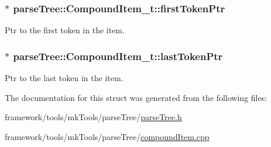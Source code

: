 \subsubsection[{\texorpdfstring{first\+Token\+Ptr}{firstTokenPtr}}]{$\ast$ parse\+Tree\+::\+Compound\+Item\+\_\+t\+::first\+Token\+Ptr}\hypertarget{structparse_tree_1_1_compound_item__t_a587020c943e760cb0152dd8cd31e21ef}{}\label{structparse_tree_1_1_compound_item__t_a587020c943e760cb0152dd8cd31e21ef}


Ptr to the first token in the item. 

\subsubsection[{\texorpdfstring{last\+Token\+Ptr}{lastTokenPtr}}]{$\ast$ parse\+Tree\+::\+Compound\+Item\+\_\+t\+::last\+Token\+Ptr}\hypertarget{structparse_tree_1_1_compound_item__t_aa6fedf65975afb0cbe1d6e952e71c6e3}{}\label{structparse_tree_1_1_compound_item__t_aa6fedf65975afb0cbe1d6e952e71c6e3}


Ptr to the last token in the item. 



The documentation for this struct was generated from the following files\+:\begin{DoxyCompactItemize}
\item 
framework/tools/mk\+Tools/parse\+Tree/\hyperlink{parse_tree_8h}{parse\+Tree.\+h}\item 
framework/tools/mk\+Tools/parse\+Tree/\hyperlink{compound_item_8cpp}{compound\+Item.\+cpp}\end{DoxyCompactItemize}
